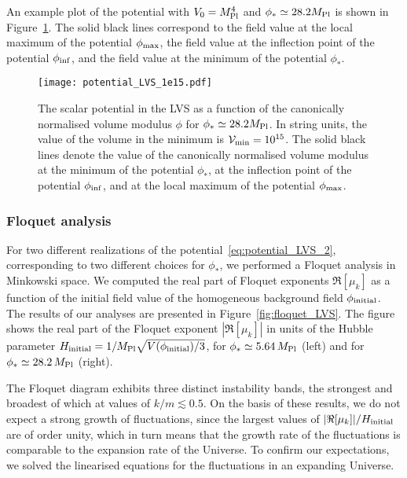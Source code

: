\documentclass[12pt]{article}
\begin{document}
An example plot of the potential with $V_0=M_{\rm Pl}^4$ and $\phi_*\simeq28.2 M_{\rm Pl}$ is shown in Figure~\ref{fig:LVS_potential}. The solid black lines correspond to the field value at the local maximum of the potential $\phi_{\rm max}$, the field value at the inflection point of the potential $\phi_{\rm inf}$, and the field value at the minimum of the potential $\phi_*$.
\begin{figure}[tbp]
\centering
\texttt{[image: potential\_LVS\_1e15.pdf]}
\caption{The scalar potential in the LVS as a function of the canonically normalised volume modulus $\phi$ for $\phi_*\simeq28.2 M_{\rm Pl}$. In string units, the value of the volume in the minimum is $\mathcal{V}_{\rm min}=10^{15}$. The solid black lines denote the value of the canonically normalised volume modulus at the minimum of the potential $\phi_*$, at the inflection point of the potential $\phi_{\rm inf}$, and at the local maximum of the potential $\phi_{\rm max}$. }
\label{fig:LVS_potential}
\end{figure}

\subsubsection{Floquet analysis}
\label{sec:floquet_LVS}
For two different realizations of the potential~\eqref{eq:potential_LVS_2}, corresponding to two different choices for $\phi_*$, we performed a Floquet analysis in Minkowski space. We computed the real part of Floquet exponents $\Re[\mu_k]$ as a function of the initial field value of the homogeneous background field $\phi_{\rm initial}$. The results of our analyses are presented in Figure~\ref{fig:floquet_LVS}. The figure shows the real part of the Floquet exponent $|\Re[\mu_k]|$ in units of the Hubble parameter $H_{\rm initial}=1/M_{\rm Pl}\sqrt{V(\phi_{\rm initial})/3}$, for $\phi_* \simeq 5.64 \,M_{\rm Pl}$ (left) and for $\phi_* \simeq 28.2 \,M_{\rm Pl}$  (right).

The Floquet diagram exhibits three distinct instability bands, the strongest and broadest of which at values of $k/m\lesssim0.5$. On the basis of these results, we do not expect a strong growth of fluctuations, since the largest values of $|\Re[\mu_k]|/H_{\rm initial}$ are of order unity, which in turn means that the growth rate of the fluctuations is comparable to the expansion rate of the Universe. To confirm our expectations, we solved the linearised equations for the fluctuations in an expanding Universe.
\end{document}

